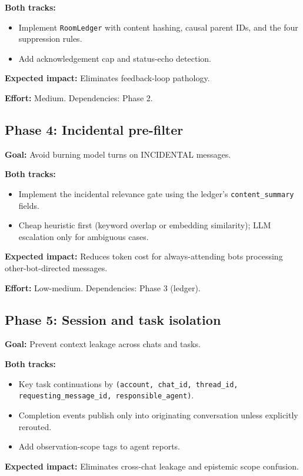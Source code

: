 \documentclass[11pt]{article}
\begin{document}
\textbf{Both tracks:}
\begin{itemize}
\item Implement \texttt{RoomLedger} with content hashing, causal parent IDs,
and the four suppression rules.
\item Add acknowledgement cap and status-echo detection.
\end{itemize}

\textbf{Expected impact:} Eliminates feedback-loop pathology.

\textbf{Effort:} Medium.  Dependencies: Phase 2.

\subsection{Phase 4: Incidental pre-filter}

\textbf{Goal:} Avoid burning model turns on INCIDENTAL messages.

\textbf{Both tracks:}
\begin{itemize}
\item Implement the incidental relevance gate using the ledger's
\texttt{content\_summary} fields.
\item Cheap heuristic first (keyword overlap or embedding similarity); LLM
escalation only for ambiguous cases.
\end{itemize}

\textbf{Expected impact:} Reduces token cost for always-attending bots
processing other-bot-directed messages.

\textbf{Effort:} Low-medium.  Dependencies: Phase 3 (ledger).

\subsection{Phase 5: Session and task isolation}

\textbf{Goal:} Prevent context leakage across chats and tasks.

\textbf{Both tracks:}
\begin{itemize}
\item Key task continuations by \texttt{(account, chat\_id, thread\_id,
requesting\_message\_id, responsible\_agent)}.
\item Completion events publish only into originating conversation unless
explicitly rerouted.
\item Add observation-scope tags to agent reports.
\end{itemize}

\textbf{Expected impact:} Eliminates cross-chat leakage and epistemic scope
confusion.
\end{document}
